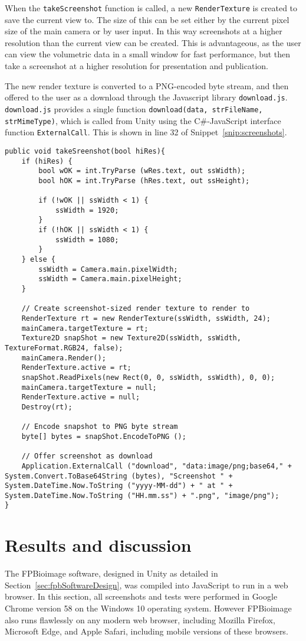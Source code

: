 When the \texttt{takeScreenshot} function is called, a new \texttt{RenderTexture} is created to save the current view to.
The size of this can be set either by the current pixel size of the main camera or by user input.
In this way screenshots at a higher resolution than the current view can be created.
This is advantageous, as the user can view the volumetric data in a small window for fast performance, but then take a screenshot at a higher resolution for presentation and publication.

The new render texture is converted to a PNG-encoded byte stream, and then offered to the user as a download through the Javascript library \texttt{download.js}.
\texttt{download.js} provides a single function \texttt{download(data, strFileName, strMimeType)}, which is called from Unity using the C\#-JavaScript interface function \texttt{ExternalCall}.
This is shown in line 32 of Snippet~\ref{snip:screenshots}.

\begin{lstlisting}[language={[Sharp]c}, label={snip:screenshots}, caption={C\# code for capturing a high-resolution screenshot and presenting it to the user as a download.}]
public void takeSreenshot(bool hiRes){
	if (hiRes) {
		bool wOK = int.TryParse (wRes.text, out ssWidth);
		bool hOK = int.TryParse (hRes.text, out ssHeight);

		if (!wOK || ssWidth < 1) {
			ssWidth = 1920;
		}
		if (!hOK || ssWidth < 1) {
			ssWidth = 1080;
		}
	} else {
		ssWidth = Camera.main.pixelWidth;
		ssWidth = Camera.main.pixelHeight;
	}

	// Create screenshot-sized render texture to render to
	RenderTexture rt = new RenderTexture(ssWidth, ssWidth, 24);
	mainCamera.targetTexture = rt;
	Texture2D snapShot = new Texture2D(ssWidth, ssWidth, TextureFormat.RGB24, false);
	mainCamera.Render();
	RenderTexture.active = rt;
	snapShot.ReadPixels(new Rect(0, 0, ssWidth, ssWidth), 0, 0);
	mainCamera.targetTexture = null;
	RenderTexture.active = null;
	Destroy(rt);

	// Encode snapshot to PNG byte stream
	byte[] bytes = snapShot.EncodeToPNG ();

	// Offer screenshot as download
	Application.ExternalCall ("download", "data:image/png;base64," + System.Convert.ToBase64String (bytes), "Screenshot " + System.DateTime.Now.ToString ("yyyy-MM-dd") + " at " + System.DateTime.Now.ToString ("HH.mm.ss") + ".png", "image/png");
}
\end{lstlisting}

\section{Results and discussion} \label{sec:fpbResults}
The FPBioimage software, designed in Unity as detailed in Section~\ref{sec:fpbSoftwareDesign}, was compiled into JavaScript to run in a web browser.
In this section, all screenshots and tests were performed in Google Chrome version 58 on the Windows 10 operating system.
However FPBioimage also runs flawlessly on any modern web browser, including Mozilla Firefox, Microsoft Edge, and Apple Safari, including mobile versions of these browsers.

